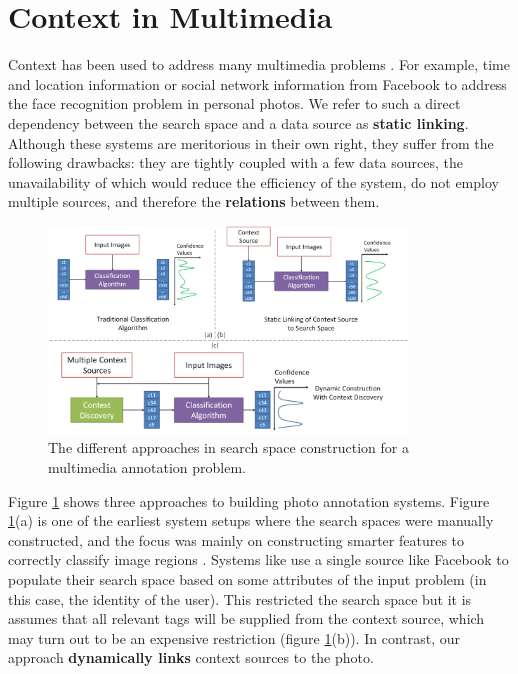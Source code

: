 \section{Context in Multimedia}

Context has been used to address many multimedia problems \cite{henter2012tag, li2012fusing, naaman2005identity, o2009context,stone2008autotagging}. For example, time and location information or social network information from Facebook to address the face recognition problem in personal photos. We refer to such a direct dependency between the search space and a data source as \textbf{static linking}. Although these systems are meritorious in their own right, they suffer from the following drawbacks: they are tightly coupled with a few data sources, the unavailability of which would reduce the efficiency of the system, do not employ multiple sources, and therefore the \textbf{relations} between them. 

\begin{figure}[t]
\centering
\includegraphics[width=0.85\textwidth]{media/with-without-cuenet-2.png}
\caption{The different approaches in search space construction for a multimedia annotation problem.}
\label{fig:with-without-cuenet}
\end{figure}

Figure \ref{fig:with-without-cuenet} shows three approaches to building photo annotation systems. Figure \ref{fig:with-without-cuenet}(a) is one of the earliest system setups where the search spaces were manually constructed, and the focus was mainly on constructing smarter features to correctly classify image regions \cite{turk1991eigenfaces, belhumeur1997eigenfaces}. Systems like \cite{stone2008autotagging} use a single source like Facebook to populate their search space based on some attributes of the input problem (in this case, the identity of the user). This restricted the search space but it is assumes that all relevant tags will be supplied from the context source, which may turn out to be an expensive restriction (figure \ref{fig:with-without-cuenet}(b)). In contrast, our approach \textbf{dynamically links} context sources to the photo.

